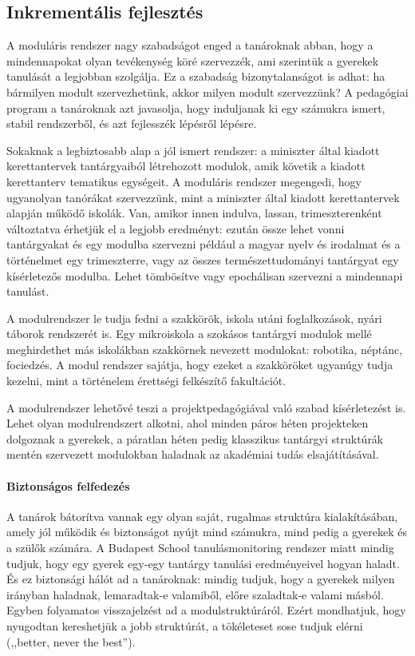 \subsection{Inkrementális fejlesztés}
A moduláris rendszer nagy szabadságot enged a tanároknak abban, hogy a mindennapokat olyan tevékenység köré szervezzék, ami szerintük a gyerekek tanulását a legjobban szolgálja. Ez a szabadság bizonytalanságot is adhat: ha bármilyen modult szervezhetünk, akkor milyen modult szervezzünk? A pedagógiai program a tanároknak azt javasolja, hogy induljanak ki egy számukra ismert, stabil rendszerből, és azt fejlesszék lépésről lépésre.

Sokaknak a legbiztosabb alap a jól ismert rendszer: a miniszter által kiadott kerettantervek tantárgyaiból létrehozott modulok, amik követik a kiadott kerettanterv tematikus egységeit. A moduláris rendszer megengedi, hogy ugyanolyan tanórákat szervezzünk, mint a miniszter által kiadott kerettantervek alapján működő iskolák. Van, amikor innen indulva, lassan, trimeszterenként változtatva érhetjük el a legjobb eredményt: ezután össze lehet vonni tantárgyakat és egy modulba szervezni például a magyar nyelv és irodalmat és a történelmet egy trimeszterre, vagy az összes természettudományi tantárgyat egy kísérletezős modulba. Lehet tömbösítve vagy epochálisan szervezni a mindennapi tanulást.

A modulrendszer le tudja fedni a szakkörök, iskola utáni foglalkozások, nyári táborok rendszerét is. Egy mikroiskola a szokásos tantárgyi modulok mellé meghirdethet más iskolákban szakkörnek nevezett modulokat: robotika, néptánc, fociedzés. A modul rendszer sajátja, hogy ezeket a szakköröket ugyanúgy tudja kezelni, mint a történelem érettségi felkészítő fakultációt.

A modulrendszer lehetővé teszi a projektpedagógiával való szabad kísérletezést is. Lehet olyan modulrendszert alkotni, ahol minden páros héten projekteken dolgoznak a gyerekek, a páratlan héten pedig klasszikus tantárgyi struktúrák mentén szervezett modulokban haladnak az akadémiai tudás elsajátításával.

\paragraph{Biztonságos felfedezés}
A tanárok bátorítva vannak egy olyan saját, rugalmas struktúra kialakításában, amely jól működik és biztonságot nyújt mind számukra, mind pedig a gyerekek és a szülők számára. A Budapest School tanulásmonitoring rendszer miatt mindig tudjuk, hogy egy gyerek egy-egy tantárgy tanulási eredményeivel hogyan haladt. És ez biztonsági hálót ad a tanároknak: mindig tudjuk, hogy a gyerekek milyen irányban haladnak, lemaradtak-e valamiből, előre szaladtak-e valami másból. Egyben folyamatos visszajelzést ad a modulstruktúráról. Ezért mondhatjuk, hogy nyugodtan kereshetjük a jobb struktúrát, a tökéleteset sose tudjuk elérni (,,better, never the best'').
